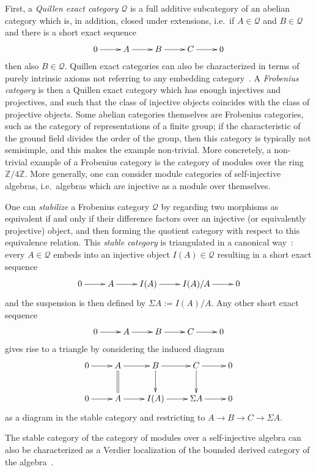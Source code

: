 \documentclass{amsproc}
\theoremstyle{definition}
\begin{document}
First, a \emph{Quillen exact category} ${\mathcal{Q}}$ is a full additive subcategory of an abelian category which is, in addition, closed under extensions, i.e.~if $A\in{\mathcal{Q}}$ and $B\in{\mathcal{Q}}$ and there is a short exact sequence
\[
\xymatrix{ 0 \ar[r] & A \ar[r] & B \ar[r] & C \ar[r] & 0 }
\]
then also $B\in{\mathcal{Q}}$. Quillen exact categories can also be characterized in terms of purely intrinsic axioms not referring to any embedding category~\cite{BÃ¼hler}. A \emph{Frobenius category} is then a Quillen exact category which has enough injectives and projectives, and such that the class of injective objects coincides with the class of projective objects. Some abelian categories themselves are Frobenius categories, such as the category of representations of a finite group; if the characteristic of the ground field divides the order of the group, then this category is typically not semisimple, and this makes the example non-trivial. More concretely, a non-trivial example of a Frobenius category is the category of modules over the ring ${\mathbb{Z}}/4{\mathbb{Z}}$. More generally, one can consider module categories of self-injective algebras, i.e.~algebras which are injective as a module over themselves.

One can \emph{stabilize} a Frobenius category ${\mathcal{Q}}$ by regarding two morphisms as equivalent if and only if their difference factors over an injective (or equivalently projective) object, and then forming the quotient category with respect to this equivalence relation. This \emph{stable category} is triangulated in a canonical way~\cite[Ch.~2]{Happel}: every $A\in{\mathcal{Q}}$ embeds into an injective object $I(A)\in{\mathcal{Q}}$ resulting in a short exact sequence
\[
\xymatrix{ 0 \ar[r] & A \ar[r] & I(A) \ar[r] & I(A)/A \ar[r] & 0 }
\]
and the suspension is then defined by $\Sigma A:= I(A)/A$. Any other short exact sequence
\[
\xymatrix{ 0 \ar[r] & A \ar[r] & B \ar[r] & C \ar[r] & 0 }
\]
gives rise to a triangle by considering the induced diagram
\[
\xymatrix{ 0 \ar[r] & A \ar[r] \ar@{=}[d] & B \ar[r] \ar[d] & C \ar[r] \ar[d] & 0 \\
	   0 \ar[r] & A \ar[r]            & I(A) \ar[r]     & \Sigma A \ar[r] & 0 }
\]
as a diagram in the stable category and restricting to $A{\longrightarrow} B{\longrightarrow} C{\longrightarrow} \Sigma A$.

The stable category of the category of modules over a self-injective algebra can also be characterized as a Verdier localization of the bounded derived category of the algebra~\cite[Thm.~2.1]{Rickard}.
\end{document}
